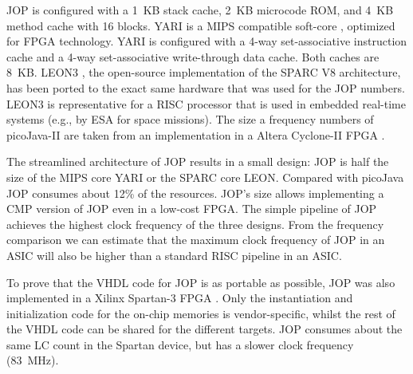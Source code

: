 JOP is configured with a 1~KB stack cache, 2~KB microcode ROM, and
4~KB method cache with 16 blocks. YARI is a MIPS compatible soft-core
\cite{cacao:yari:techrep}, optimized for FPGA technology. YARI is
configured with a 4-way set-associative instruction cache and a 4-way
set-associative write-through data cache. Both caches are 8~KB. LEON3
\cite{LEON}, the open-source implementation of the SPARC V8
architecture, has been ported to the exact same hardware that was
used for the JOP numbers. LEON3 is representative for a RISC
processor that is used in embedded real-time systems (e.g., by ESA
for space missions). The size a frequency numbers of picoJava-II
\cite{pJ1} are taken from an implementation in a Altera Cyclone-II
FPGA \cite{master:puffitsch}.



The streamlined architecture of JOP results in a small design: JOP is
half the size of the MIPS core YARI or the SPARC core LEON. Compared
with picoJava JOP consumes about 12\% of the resources. JOP's size
allows implementing a CMP version of JOP even in a low-cost FPGA. The
simple pipeline of JOP achieves the highest clock frequency of the
three designs. From the frequency comparison we can estimate that the
maximum clock frequency of JOP in an ASIC will also be higher than a
standard RISC pipeline in an ASIC.


To prove that the VHDL code for JOP is as portable as possible, JOP
was also implemented in a Xilinx Spartan-3 FPGA \cite{Spartan3}. Only
the instantiation and initialization code for the on-chip memories is
vendor-specific, whilst the rest of the VHDL code can be shared for
the different targets. JOP consumes about the same LC count in the
Spartan device, but has a slower clock frequency (83~MHz).



